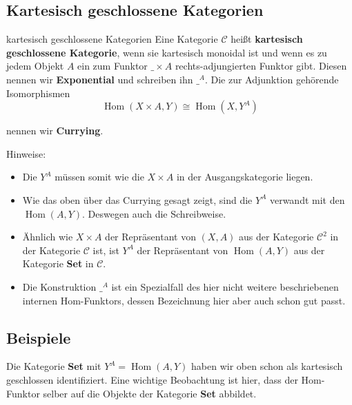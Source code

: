 \documentclass[a4paper]{amsart}
\theoremstyle{definition}
\DeclareMathOperator{\Hom}{Hom}
\begin{document}
\subsection{Kartesisch geschlossene Kategorien}

\begin{Definition}{kartesisch geschlossene Kategorien}
   Eine Kategorie $\mathcal C$ heißt \textbf{kartesisch geschlossene Kategorie}, wenn sie kartesisch monoidal ist und wenn es zu jedem Objekt $A$ ein zum Funktor $\_ \times A$ rechts-adjungierten Funktor gibt. Diesen nennen wir \textbf{Exponential} und schreiben ihn $\_ ^A$. Die zur Adjunktion gehörende Isomorphismen
   \begin{equation}
      \Hom( X \times A, Y ) \cong \Hom( X, Y^A )
   \end{equation}
\end{Definition}
nennen wir \textbf{Currying}.

Hinweise:
\begin{itemize}
   \item Die $Y^A$ müssen somit wie die $X \times A$ in der Ausgangskategorie liegen.
   \item Wie das oben über das Currying gesagt zeigt, sind die $Y^A$ verwandt mit den $\Hom( A, Y)$. Deswegen auch die Schreibweise.
   \item Ähnlich wie $X \times A$ der Repräsentant von $(X, A)$ aus der Kategorie $\mathcal C^2$ in der Kategorie $\mathcal C$ ist, ist $Y^A$ der Repräsentant von $\Hom( A, Y)$ aus der Kategorie \textbf{Set} in $\mathcal C$.
   \item Die Konstruktion $\_ ^A$ ist ein Spezialfall des hier nicht weitere beschriebenen internen Hom-Funktors, dessen Bezeichnung hier aber auch schon gut passt.
\end{itemize}

\subsection{Beispiele}
Die Kategorie \textbf{Set} mit $Y^A = \Hom( A, Y)$ haben wir oben schon als kartesisch geschlossen identifiziert. Eine wichtige Beobachtung ist hier, dass der Hom-Funktor selber auf die Objekte der Kategorie \textbf{Set} abbildet. 
\end{document}
